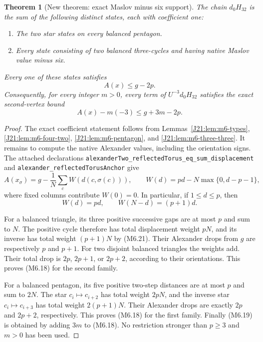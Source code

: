 \documentclass[11pt,oneside]{report}
\newtheorem{theorem}{Theorem}[section]
\theoremstyle{definition}
\numberwithin{equation}{section}
\newcommand{\decl}[1]{\textnormal{\nolinkurl{#1}}}
\begin{document}
\begin{theorem}[New theorem: exact Maslov minus six support]
\label{J21:thm:h32-m6-support}
The chain $d_0H_{32}$ is the sum of the following distinct states,
each with coefficient one:
\begin{enumerate}
 \item The two star states on every balanced pentagon.
 \item Every state consisting of two balanced three-cycles and having
       native Maslov value minus six.
\end{enumerate}
Every one of these states satisfies
\[
                              A(x)\leq g-2p.
 \tag{M6.18}
\]
Consequently, for every integer $m>0$, every term of
$U^{-3}d_0H_{32}$ satisfies the exact second-vertex bound
\[
                 A(x)-m(-3)\leq g+3m-2p.
 \tag{M6.19}
\]
\end{theorem}
\begin{proof}
The exact coefficient statement follows from
Lemmas~\ref{J21:lem:m6-types}, \ref{J21:lem:m6-four-two},
\ref{J21:lem:m6-pentagon}, and \ref{J21:lem:m6-three-three}.
It remains to compute the native Alexander values, including the
orientation signs.
The attached declarations
\decl{alexanderTwo_reflectedTorus_eq_sum_displacement}
and
\decl{alexander_reflectedTorusAnchor}
give
\[
 A(x_\sigma)=g-\frac1N\sum_c W(d(c,\sigma(c))),
 \qquad
 W(d)=pd-N\max\{0,d-p-1\},
 \tag{M6.20}
\]
where fixed columns contribute $W(0)=0$.
In particular, if $1\leq d\leq p$, then
\[
                    W(d)=pd,\qquad W(N-d)=(p+1)d.
 \tag{M6.21}
\]

For a balanced triangle, its three positive successive gaps are at
most $p$ and sum to $N$.
The positive cycle therefore has total displacement weight $pN$,
and its inverse has total weight $(p+1)N$ by (M6.21).
Their Alexander drops from $g$ are respectively $p$ and $p+1$.
For two disjoint balanced triangles the weights add.
Their total drop is $2p$, $2p+1$, or $2p+2$, according to their
orientations. This proves (M6.18) for the second family.

For a balanced pentagon, its five positive two-step distances are
at most $p$ and sum to $2N$.
The star $c_i\mapsto c_{i+2}$ has total weight $2pN$, and the
inverse star $c_i\mapsto c_{i+3}$ has total weight $2(p+1)N$.
Their Alexander drops are exactly $2p$ and $2p+2$, respectively.
This proves (M6.18) for the first family.
Finally (M6.19) is obtained by adding $3m$ to (M6.18).
No restriction stronger than $p\geq3$ and $m>0$ has been used.
\end{proof}
\end{document}
